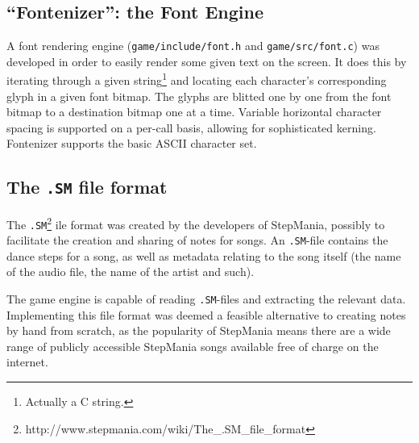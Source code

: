 \subsection{``Fontenizer'': the Font Engine}
	A font rendering engine (\texttt{game/include/font.h} and \texttt{game/src/font.c}) was developed in order to easily render some given text on the screen.
	It does this by iterating through a given string\footnote{Actually a C string.} and locating each character's corresponding glyph in a given font bitmap.
	The glyphs are blitted one by one from the font bitmap to a destination bitmap one at a time.
    Variable horizontal character spacing is supported on a per-call basis, allowing for sophisticated kerning.
    Fontenizer supports the basic ASCII character set.
        
\subsection{The \texttt{.SM} file format}
The \texttt{.SM}\footnote{http://www.stepmania.com/wiki/The_.SM_file_format} ile format was created by the developers of StepMania, possibly to facilitate the creation and sharing of notes for songs.
An \texttt{.SM}-file contains the dance steps for a song, as well as metadata relating to the song itself (the name of the audio file, the name of the artist and such).

The game engine is capable of reading \texttt{.SM}-files and extracting the relevant data.
Implementing this file format was deemed a feasible alternative to creating notes by hand from scratch, as the popularity of StepMania means there are a wide range of publicly accessible StepMania songs available free of charge on the internet.
